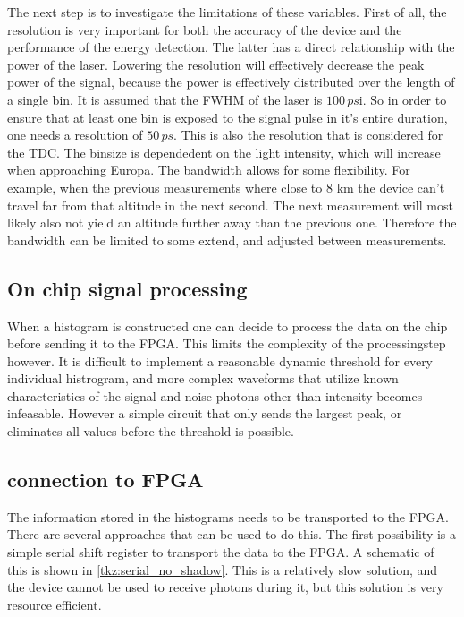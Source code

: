 The next step is to investigate the limitations of these variables. First of all, the resolution is very important for both the accuracy of the device and the performance of the energy detection. The latter has a direct relationship with the power of the laser. Lowering the resolution will effectively decrease the peak power of the signal, because the power is effectively distributed over the length of a single bin. It is assumed that the FWHM of the laser is $100\,ps$i. So in order to ensure that at least one bin is exposed to the signal pulse in it's entire duration, one needs a resolution of $50\,ps$. This is also the resolution that is considered for the TDC. The binsize is dependedent on the light intensity, which will increase when approaching Europa. The bandwidth allows for some flexibility. For example, when the previous measurements where close to 8 km the device can't travel far from that altitude in the next second. The next measurement will most likely also not yield an altitude further away than the previous one. Therefore the bandwidth can be limited to some extend, and adjusted between measurements.

\subsection{On chip signal processing}
When a histogram is constructed one can decide to process the data on the chip before sending it to the FPGA. This limits the complexity of the processingstep however. It is difficult to implement a reasonable dynamic threshold for every individual histrogram, and more complex waveforms that utilize known characteristics of the signal and noise photons other than intensity becomes infeasable. However a simple circuit that only sends the largest peak, or eliminates all values before the threshold is possible. 

\subsection{connection to FPGA}
The information stored in the histograms needs to be transported to the FPGA. There are several approaches that can be used to do this. The first possibility is a simple serial shift register to transport the data to the FPGA. A schematic of this is shown in \cref{tkz:serial_no_shadow}. This is a relatively slow solution, and the device cannot be used to receive photons during it, but this solution is very resource efficient.



